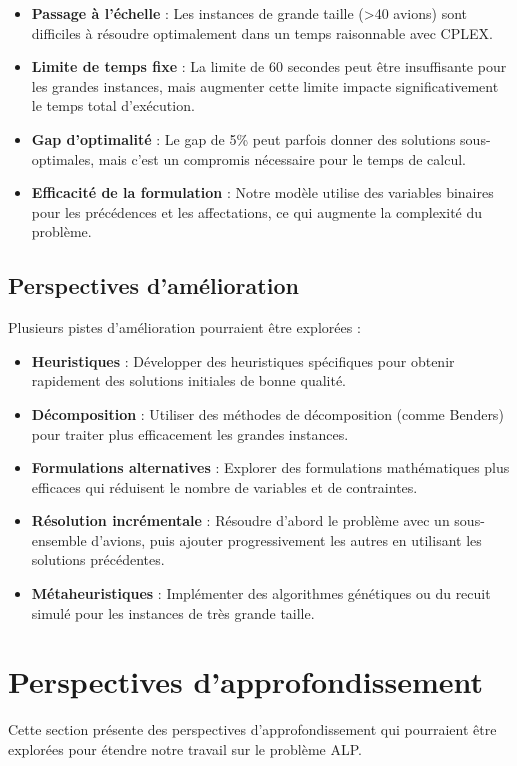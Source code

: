 \documentclass[a4paper,12pt]{report}
\begin{document}
\begin{itemize}
  \item \textbf{Passage à l'échelle} : Les instances de grande taille (>40 avions) sont difficiles à résoudre optimalement dans un temps raisonnable avec CPLEX.
  \item \textbf{Limite de temps fixe} : La limite de 60 secondes peut être insuffisante pour les grandes instances, mais augmenter cette limite impacte significativement le temps total d'exécution.
  \item \textbf{Gap d'optimalité} : Le gap de 5\% peut parfois donner des solutions sous-optimales, mais c'est un compromis nécessaire pour le temps de calcul.
  \item \textbf{Efficacité de la formulation} : Notre modèle utilise des variables binaires pour les précédences et les affectations, ce qui augmente la complexité du problème.
\end{itemize}

\subsection{Perspectives d'amélioration}
Plusieurs pistes d'amélioration pourraient être explorées :

\begin{itemize}
  \item \textbf{Heuristiques} : Développer des heuristiques spécifiques pour obtenir rapidement des solutions initiales de bonne qualité.
  \item \textbf{Décomposition} : Utiliser des méthodes de décomposition (comme Benders) pour traiter plus efficacement les grandes instances.
  \item \textbf{Formulations alternatives} : Explorer des formulations mathématiques plus efficaces qui réduisent le nombre de variables et de contraintes.
  \item \textbf{Résolution incrémentale} : Résoudre d'abord le problème avec un sous-ensemble d'avions, puis ajouter progressivement les autres en utilisant les solutions précédentes.
  \item \textbf{Métaheuristiques} : Implémenter des algorithmes génétiques ou du recuit simulé pour les instances de très grande taille.
\end{itemize}

\section{Perspectives d'approfondissement}
Cette section présente des perspectives d'approfondissement qui pourraient être explorées pour étendre notre travail sur le problème ALP.
\end{document}
